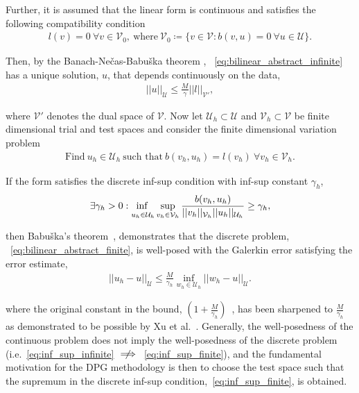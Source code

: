 Further, it is assumed that the linear form is continuous and satisfies the following compatibility condition
\begin{align}
l(v) = 0\ \forall v \in \mathcal{V}_0,\ \text{where}\ \mathcal{V}_0 \coloneqq \{v \in \mathcal{V} : b(v,u) = 0\ \forall u
\in \mathcal{U} \}.
\end{align}

Then, by the Banach-Ne\v{c}as-Babu\v{s}ka theorem ,
~\eqref{eq:bilinear_abstract_infinite} has a unique solution, $u$, that depends continuously on the data,
\begin{align}
||u||_{\mathcal{U}} \le \frac{M}{\gamma} ||l||_{\mathcal{V}'},
\end{align}

where $\mathcal{V}'$ denotes the dual space of $\mathcal{V}$. Now let $\mathcal{U}_h \subset \mathcal{U}$ and $\mathcal{V}_h
\subset \mathcal{V}$ be finite dimensional trial and test spaces and consider the finite dimensional variation problem
\begin{align} \label{eq:bilinear_abstract_finite}
\text{Find}\ u_h \in \mathcal{U}_h\ \text{such that}\
b(v_h,u_h) = l(v_h)\ \forall v_h \in \mathcal{V}_h.
\end{align}

If the form satisfies the discrete inf-sup condition with inf-sup constant $\gamma_h$,
\begin{align} \label{eq:inf_sup_finite}
\exists \gamma_h > 0 :
\adjustlimits\inf_{u_h\in\mathcal{U}_h} \sup_{v_h\in\mathcal{V}_h}
\frac{b(v_h,u_h)}{||v_h||_{\mathcal{V}_h}||u_h||_{\mathcal{U}_h}} \ge \gamma_h,
\end{align}

then Babu\v{s}ka's theorem~\cite[Theorem ]{Babuska1971}, demonstrates that the discrete problem,
~\eqref{eq:bilinear_abstract_finite}, is well-posed with the Galerkin error satisfying the error estimate,
\begin{align} \label{eq:abstract_dpg_error}
||u_h-u||_{\mathcal{U}} \le \frac{M}{\gamma_h} \inf_{w_h \in \mathcal{U}_h} ||w_h-u||_{\mathcal{U}}.
\end{align}

where the original constant in the bound, $\left( 1 + \frac{M}{\gamma_h} \right)$~\cite[eq. ()]{Babuska1971}, has been
sharpened to $\frac{M}{\gamma_h}$ as demonstrated to be possible by Xu et al.~\cite[Theorem \makeblue{2}]{Xu2003}.
Generally, the well-posedness of the continuous problem does not imply the well-posedness of the discrete problem
(i.e.~\eqref{eq:inf_sup_infinite} $\centernot\implies$~\eqref{eq:inf_sup_finite}), and the fundamental motivation for
the DPG methodology is then to choose the test space such that the supremum in the discrete inf-sup
condition,~\eqref{eq:inf_sup_finite}, is obtained. 

